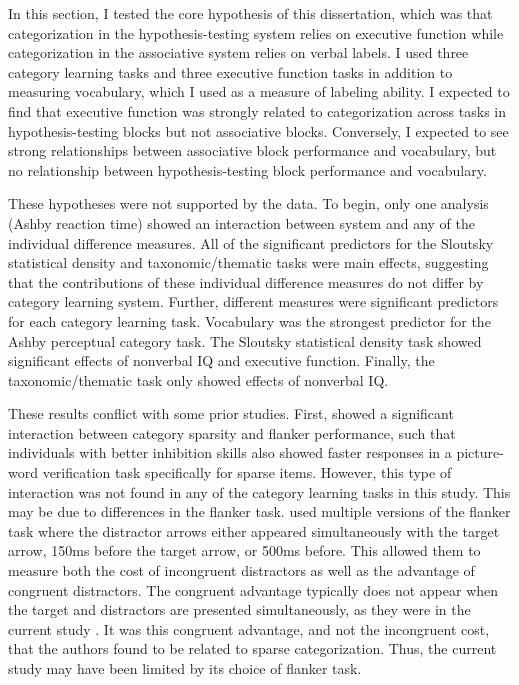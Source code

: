\documentclass[../dissertation.tex]{subfiles}
\begin{document}
	In this section, I tested the core hypothesis of this dissertation, which was that categorization in the hypothesis-testing system relies on executive function while categorization in the associative system relies on verbal labels. I used three category learning tasks and three executive function tasks in addition to measuring vocabulary, which I used as a measure of labeling ability. I expected to find that executive function was strongly related to categorization across tasks in hypothesis-testing blocks but not associative blocks. Conversely, I expected to see strong relationships between associative block performance and vocabulary, but no relationship between hypothesis-testing block performance and vocabulary. \par 
	These hypotheses were not supported by the data. To begin, only one analysis (Ashby reaction time) showed an interaction between system and any of the individual difference measures. All of the significant predictors for the Sloutsky statistical density and taxonomic/thematic tasks were main effects, suggesting that the contributions of these individual difference measures do not differ by category learning system. Further, different measures were significant predictors for each category learning task. Vocabulary was the strongest predictor for the Ashby perceptual category task. The Sloutsky statistical density task showed significant effects of nonverbal IQ and executive function. Finally, the taxonomic/thematic task only showed effects of nonverbal IQ. \par
	These results conflict with some prior studies. First, \citet{Perry2016} showed a significant interaction between category sparsity and flanker performance, such that individuals with better inhibition skills also showed faster responses in a picture-word verification task specifically for sparse items. However, this type of interaction was not found in any of the category learning tasks in this study. This may be due to differences in the flanker task. \citet{Perry2016} used multiple versions of the flanker task where the distractor arrows either appeared simultaneously with the target arrow, 150ms before the target arrow, or 500ms before. This allowed them to measure both the cost of incongruent distractors as well as the advantage of congruent distractors. The congruent advantage typically does not appear when the target and distractors are presented simultaneously, as they were in the current study \citep{Botella2002}. It was this congruent advantage, and not the incongruent cost, that the authors found to be related to sparse categorization. Thus, the current study may have been limited by its choice of flanker task. \par 
	 
\end{document}
